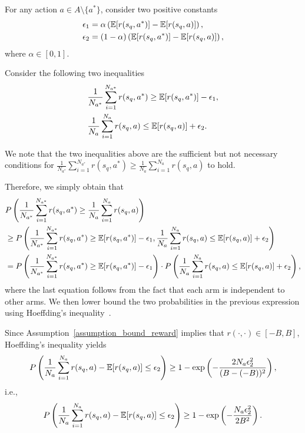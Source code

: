 \begin{myproof}
For any action $a \in A \setminus \{a^*\} $, consider two positive constants
\begin{align}
    &\epsilon_1 = \alpha \left( {\mathbb E}[r(s_q, a^*)] - {\mathbb E}[r(s_q, a)] \right), \\
    &\epsilon_2 = (1 - \alpha) \left( {\mathbb E}[r(s_q, a^*)] - {\mathbb E}[r(s_q, a)] \right),
\end{align}
where $\alpha \in [0, 1]$.

Consider the following two inequalities
\begin{align}
    &\frac{1}{N_{a^*}}  \sum_{i=1}^{N_{a^*}} r(s_q, a^*) \geq {\ensuremath{\mathbb E}}[ r(s_q, a^*)] - \epsilon_1,  \\
    &\frac{1}{N_{a}} \sum_{i=1}^{N_{a}}  r(s_q, a) \leq {\ensuremath{\mathbb E}}[ r(s_q, a)] + \epsilon_2. 
\end{align}


We note that the two inequalities above are the sufficient but not necessary conditions for $\frac{1}{N_{a^*}} \sum_{i=1}^{N_{a^*}} r(s_q, a^*) \geq \frac{1}{N_{a}} \sum_{i=1}^{N_{a}} r(s_q, a)$ to hold.

Therefore, we simply obtain that
\begin{align}
    &P \left( \frac{1}{N_{a^*}}  \sum_{i=1}^{N_{a^*}} r(s_q, a^*) \geq \frac{1}{N_{a}} \sum_{i=1}^{N_{a}}  r(s_q, a) \right) \nonumber \\
    &\geq P\left( \frac{1}{N_{a^*}}  \sum_{i=1}^{N_{a^*}} r(s_q, a^*) \geq {\ensuremath{\mathbb E}}[ r(s_q, a^*)] - \epsilon_1, \frac{1}{N_{a}} \sum_{i=1}^{N_{a}}  r(s_q, a) \leq {\ensuremath{\mathbb E}}[ r(s_q, a)] + \epsilon_2 \right) \\
    &=P\left( \frac{1}{N_{a^*}}  \sum_{i=1}^{N_{a^*}} r(s_q, a^*) \geq {\ensuremath{\mathbb E}}[ r(s_q, a^*)] - \epsilon_1 \right) \cdot P\left(\frac{1}{N_{a}} \sum_{i=1}^{N_{a}}  r(s_q, a) \leq {\ensuremath{\mathbb E}}[ r(s_q, a)] + \epsilon_2 \right), 
\end{align}
%
where the last equation follows from the fact that each arm is independent to other arms.
%
%
We then lower bound the two probabilities in the previous expression using Hoeffding’s inequality~\citep{hoeffding1994probability}.

Since Assumption~\ref{assumption_bound_reward} implies that $r(\cdot, \cdot) \in [-B, B]$, Hoeffding’s inequality yields
%
\begin{align}
    P \left( \frac{1}{N_{a}} \sum_{i=1}^{N_{a}}  r(s_q, a) - {\mathbb E}[ r(s_q, a)] \leq \epsilon_2 \right) \geq 1 - \exp \left( - \frac{2 N_{a} \epsilon_2^2}{(B- (-B))^2} \right),
\end{align}
i.e.,
\begin{align}
    P \left( \frac{1}{N_{a}} \sum_{i=1}^{N_{a}}  r(s_q, a) - {\mathbb E}[ r(s_q, a)] \leq \epsilon_2 \right) \geq 1 - \exp \left( - \frac{N_{a} \epsilon_2^2}{2B^2} \right).
\end{align}



\end{myproof}
